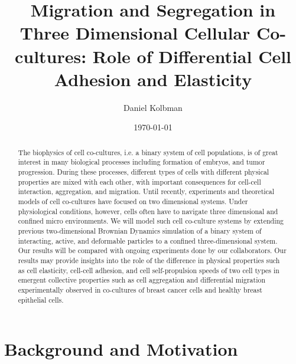 \documentclass[aps,prb,twocolumn,groupedaddress,nofootinbib,floatfix]{revtex4}
\begin{document}
%
\title{Migration and Segregation in Three Dimensional Cellular Co-cultures: Role of
Differential Cell Adhesion and Elasticity}

%
\author{Daniel Kolbman}
%
%
%

\date{\today}

\begin{abstract} \noindent The biophysics of cell co-cultures, i.e. a binary system of cell populations, is of great interest in many biological processes including formation of embryos, and tumor progression. 
During these processes, different types of cells with different physical properties are mixed with each other, with important consequences for cell-cell interaction, aggregation, and migration. 
Until recently, experiments and theoretical models of cell co-cultures have focused on two dimensional systems. Under physiological conditions, however, cells often have to  
navigate three dimensional and confined micro environments. We will model such cell co-culture systems by extending previous two-dimensional Brownian Dynamics simulation of a binary system of interacting, 
active, and deformable particles to a confined three-dimensional system. Our results will be compared with ongoing experiments done by our collaborators. Our results may 
provide insights into the role of the difference in physical properties such as cell elasticity, cell-cell adhesion, and cell self-propulsion speeds of two cell types in emergent collective properties 
such as cell aggregation and differential migration experimentally observed in co-cultures of breast cancer cells and healthy breast epithelial cells.  

\end{abstract}

\maketitle

\section{Background and Motivation}
\end{document}
